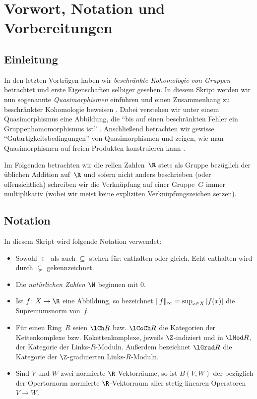 
\chapter{Vorwort, Notation und Vorbereitungen}
\section{Einleitung}
In den letzten Vorträgen haben wir \emph{beschränkte Kohomologie von Gruppen}
betrachtet und erste Eigenschaften selbiger gesehen. In diesem Skript werden
wir nun sogenannte \emph{Quasimorphismen} einführen und einen Zusammenhang zu
beschränkter Kohomologie beweisen . Dabei verstehen wir unter
einem Quasimorphismus eine Abbildung, die \enquote{bis auf einen beschränkten
Fehler ein Gruppenhomomorphismus ist} . Anschließend betrachten wir
gewisse \enquote{Gutartigkeitsbedingungen} von Quasimorphismen 
und zeigen, wie man Quasimorphismen auf freien Produkten konstruieren kann
.

Im Folgenden betrachten wir die rellen Zahlen~$\R$ stets als Gruppe bezüglich
der üblichen Addition auf~$\R$ und sofern nicht anders beschrieben (oder
offensichtlich) schreiben wir die Verknüpfung auf einer Gruppe~$G$ immer
multiplikativ (wobei wir meist keine expliziten Verknüpfungszeichen setzen).

\section{Notation}
In diesem Skript wird folgende Notation verwendet:
\begin{itemize}
    \item
        Sowohl $\subset$ als auch $\subseteq$ stehen für: enthalten oder gleich.
        Echt enthalten wird durch $\subsetneq$ gekennzeichnet.
    
    \item
        Die \emph{natürlichen Zahlen $\N$} beginnen mit $0$.

    \item
        Ist $f\colon X\to\R$ eine Abbildung, so bezeichnet
        $\lVert f\rVert_\infty = \sup_{x\in X}\,\lvert f(x)\rvert$ die
        Supremumsnorm von~$f$.

    \item
        Für einen Ring~$R$ seien $\lCh R$ bzw. $\lCoCh R$
        die Kategorien der Kettenkomplexe bzw. Kokettenkomplexe, jeweils
        $\Z$-indiziert und in $\lMod R$, der Kategorie der Links-$R$-Moduln.
        Außerdem bezeichnet $\lGrad R$ die Kategorie der $\Z$-graduierten
        Links-$R$-Moduln.

    \item
        Sind $V$ und $W$ zwei normierte $\R$-Vektorräume, so ist
        $B(V,W)$ der bezüglich der Opertornorm normierte $\R$-Vektorraum
        aller stetig linearen Operatoren $V\to W$.
\end{itemize}

